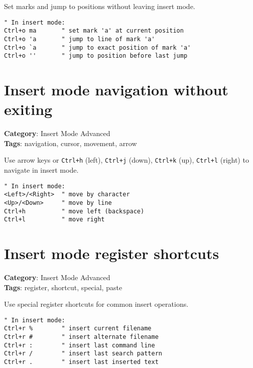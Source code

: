 {{{{{Set marks and jump to positions without leaving insert mode.

\begin{Exa*}{}
\begin{Verbatim}[fontsize=\footnotesize, breaklines, breakanywhere]
" In insert mode:
Ctrl+o ma       " set mark 'a' at current position
Ctrl+o 'a       " jump to line of mark 'a'
Ctrl+o `a       " jump to exact position of mark 'a'
Ctrl+o ''       " jump to position before last jump
\end{Verbatim}
\end{Exa*}

\section{Insert mode navigation without exiting}

\textbf{Category}: Insert Mode Advanced\\ \textbf{Tags}: navigation, cursor, movement, arrow
\vspace{0.5cm}

Use arrow keys or {\footnotesize \Verb§Ctrl+h§} (left), {\footnotesize \Verb§Ctrl+j§} (down), {\footnotesize \Verb§Ctrl+k§} (up), {\footnotesize \Verb§Ctrl+l§} (right) to navigate in insert mode.

\begin{Exa*}{}
\begin{Verbatim}[fontsize=\footnotesize, breaklines, breakanywhere]
" In insert mode:
<Left>/<Right>  " move by character
<Up>/<Down>     " move by line
Ctrl+h          " move left (backspace)
Ctrl+l          " move right
\end{Verbatim}
\end{Exa*}

\section{Insert mode register shortcuts}

\textbf{Category}: Insert Mode Advanced\\ \textbf{Tags}: register, shortcut, special, paste
\vspace{0.5cm}

Use special register shortcuts for common insert operations.

\begin{Exa*}{}
\begin{Verbatim}[fontsize=\footnotesize, breaklines, breakanywhere]
" In insert mode:
Ctrl+r %        " insert current filename
Ctrl+r #        " insert alternate filename
Ctrl+r :        " insert last command line
Ctrl+r /        " insert last search pattern
Ctrl+r .        " insert last inserted text
\end{Verbatim}
\end{Exa*}

}}}}}
